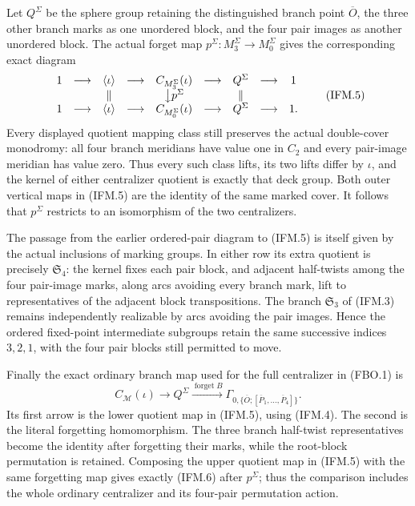Let $Q^{\Sigma}$ be the sphere group retaining the distinguished
branch point $\overline O$, the three other branch marks as one
unordered block, and the four pair images as another unordered block.
The actual forget map $p^{\Sigma}:M_3^{\Sigma}\to M_0^{\Sigma}$ gives
the corresponding exact diagram
\[
 \begin{array}{ccccccccc}
 1&\longrightarrow&\langle\iota\rangle
   &\longrightarrow&C_{M_3^{\Sigma}}(\iota)
   &\longrightarrow&Q^{\Sigma}&\longrightarrow&1\\
 &&\Vert&&\big\downarrow p^{\Sigma}&&\Vert\\
 1&\longrightarrow&\langle\iota\rangle
   &\longrightarrow&C_{M_0^{\Sigma}}(\iota)
   &\longrightarrow&Q^{\Sigma}&\longrightarrow&1.
 \end{array}
 \tag{IFM.5}
\]
Every displayed quotient mapping class still preserves the actual
double-cover monodromy: all four branch meridians have value one in
$C_2$ and every pair-image meridian has value zero.  Thus every such
class lifts, its two lifts differ by $\iota$, and the kernel of either
centralizer quotient is exactly that deck group.  Both outer vertical
maps in (IFM.5) are the identity of the same marked cover.  It follows
that $p^{\Sigma}$ restricts to an isomorphism of the two centralizers.

The passage from the earlier ordered-pair diagram to (IFM.5) is
itself given by the actual inclusions of marking groups.  In either
row its extra quotient is precisely $\mathfrak S_4$: the kernel
fixes each pair block, and adjacent half-twists among the four
pair-image marks, along arcs avoiding every branch mark, lift to
representatives of the adjacent block transpositions.  The branch
$\mathfrak S_3$ of (IFM.3) remains independently realizable by arcs
avoiding the pair images.  Hence the ordered fixed-point intermediate
subgroups retain the same successive indices $3,2,1$, with the four
pair blocks still permitted to move.

Finally the exact ordinary branch map used for the full centralizer
in (FBO.1) is
\[
 C_{\mathcal M}(\iota)
   \longrightarrow Q^{\Sigma}
   \xrightarrow{\operatorname{forget}B}
       \Gamma_{0,\{\overline O;[\overline P_1,\ldots,
                                        \overline P_4]\}}.
 \tag{IFM.6}
\]
Its first arrow is the lower quotient map in (IFM.5), using (IFM.4).
The second is the literal forgetting homomorphism.  The three branch
half-twist representatives become the identity after forgetting their
marks, while the root-block permutation is retained.  Composing the
upper quotient map in (IFM.5) with the same forgetting map gives
exactly (IFM.6) after $p^{\Sigma}$; thus the comparison includes the
whole ordinary centralizer and its four-pair permutation action.
